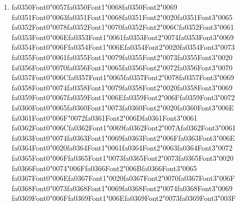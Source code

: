\documentclass[12pt]{article}
\begin{document}
\begin{enumerate}[label=Q\arabic*.]
 \item {\csname fa0350Font0\endcsname\char"0057}{\csname fa0350Font1\endcsname\char"0068}{\csname fa0350Font2\endcsname\char"0069} {\csname fa0351Font0\endcsname\char"0063}{\csname fa0351Font1\endcsname\char"0068}{\csname fa0351Font2\endcsname\char"0020}{\csname fa0351Font3\endcsname\char"0065} {\csname fa0352Font0\endcsname\char"0078}{\csname fa0352Font1\endcsname\char"0070}{\csname fa0352Font2\endcsname\char"006C}{\csname fa0352Font3\endcsname\char"0061} {\csname fa0353Font0\endcsname\char"006E}{\csname fa0353Font1\endcsname\char"0061}{\csname fa0353Font2\endcsname\char"0074}{\csname fa0353Font3\endcsname\char"0069} {\csname fa0354Font0\endcsname\char"006F}{\csname fa0354Font1\endcsname\char"006E}{\csname fa0354Font2\endcsname\char"0020}{\csname fa0354Font3\endcsname\char"0073} {\csname fa0355Font0\endcsname\char"0061}{\csname fa0355Font1\endcsname\char"0079}{\csname fa0355Font2\endcsname\char"0073}{\csname fa0355Font3\endcsname\char"0020} {\csname fa0356Font0\endcsname\char"0070}{\csname fa0356Font1\endcsname\char"0065}{\csname fa0356Font2\endcsname\char"0072}{\csname fa0356Font3\endcsname\char"0070} {\csname fa0357Font0\endcsname\char"006C}{\csname fa0357Font1\endcsname\char"0065}{\csname fa0357Font2\endcsname\char"0078}{\csname fa0357Font3\endcsname\char"0069} {\csname fa0358Font0\endcsname\char"0074}{\csname fa0358Font1\endcsname\char"0079}{\csname fa0358Font2\endcsname\char"0020}{\csname fa0358Font3\endcsname\char"0069} {\csname fa0359Font0\endcsname\char"0067}{\csname fa0359Font1\endcsname\char"006E}{\csname fa0359Font2\endcsname\char"006F}{\csname fa0359Font3\endcsname\char"0072} {\csname fa0360Font0\endcsname\char"0065}{\csname fa0360Font1\endcsname\char"0073}{\csname fa0360Font2\endcsname\char"0020}{\csname fa0360Font3\endcsname\char"006E} {\csname fa0361Font0\endcsname\char"006F}{\char"0072}{\csname fa0361Font2\endcsname\char"006D}{\csname fa0361Font3\endcsname\char"0061} {\csname fa0362Font0\endcsname\char"006C}{\csname fa0362Font1\endcsname\char"0069}{\csname fa0362Font2\endcsname\char"007A}{\csname fa0362Font3\endcsname\char"0061} {\csname fa0363Font0\endcsname\char"0074}{\csname fa0363Font1\endcsname\char"0069}{\csname fa0363Font2\endcsname\char"006F}{\csname fa0363Font3\endcsname\char"006E} {\csname fa0364Font0\endcsname\char"0020}{\csname fa0364Font1\endcsname\char"0061}{\csname fa0364Font2\endcsname\char"0063}{\csname fa0364Font3\endcsname\char"0072} {\csname fa0365Font0\endcsname\char"006F}{\csname fa0365Font1\endcsname\char"0073}{\csname fa0365Font2\endcsname\char"0073}{\csname fa0365Font3\endcsname\char"0020} {\csname fa0366Font0\endcsname\char"0074}{\char"006F}{\csname fa0366Font2\endcsname\char"006B}{\csname fa0366Font3\endcsname\char"0065} {\csname fa0367Font0\endcsname\char"006E}{\csname fa0367Font1\endcsname\char"0020}{\csname fa0367Font2\endcsname\char"0070}{\csname fa0367Font3\endcsname\char"006F} {\csname fa0368Font0\endcsname\char"0073}{\csname fa0368Font1\endcsname\char"0069}{\csname fa0368Font2\endcsname\char"0074}{\csname fa0368Font3\endcsname\char"0069} {\csname fa0369Font0\endcsname\char"006F}{\csname fa0369Font1\endcsname\char"006E}{\csname fa0369Font2\endcsname\char"0073}{\csname fa0369Font3\endcsname\char"003F}

\end{enumerate}
\end{document}
